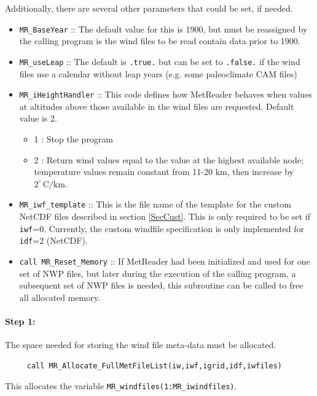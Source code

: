 \documentclass[11pt]{article}   %
\begin{document}
Additionally, there are several other parameters that could be set, if needed.
\begin{itemize}
\item \texttt{MR\_BaseYear} :: The default value for this is 1900, but must be
reassigned by the calling program is the wind files to be read contain data prior to 1900.
\item \texttt{MR\_useLeap} :: The default is \texttt{.true.} but can be set to \texttt{.false.}
if the wind files use a calendar without leap years (e.g. some paleoclimate CAM files)
\item \texttt{MR\_iHeightHandler} :: This code defines how MetReader behaves when values at
altitudes above those available in the wind files are requested.  Default value is 2.
 \begin{itemize}
 \item   1 : Stop the program
 \item   2 : Return wind values equal to the value at the highest available node; temperature
values remain constant from 11-20 km, then increase by $2^{\circ} \, \mathrm{C/km}$.
 \end{itemize}
\item \texttt{MR\_iwf\_template} :: This is the file name of the template for the
custom NetCDF files described in section \ref{SecCust}.  This is only required to be set
if \texttt{iwf}=0.  Currently, the custom windfile specification is only implemented for
\texttt{idf}=2 (NetCDF).
\item \texttt{call MR\_Reset\_Memory} :: If MetReader had been initialized and used for
one set of NWP files, but later during the execution of the calling program, a subsequent
set of NWP files is needed, this subroutine can be called to free all allocated memory.
\end{itemize}

\paragraph{Step 1:} The space needed for storing the wind file meta-data must be allocated.
\begin{verbatim}
     call MR_Allocate_FullMetFileList(iw,iwf,igrid,idf,iwfiles)
\end{verbatim}
This allocates the variable \texttt{MR\_windfiles(1:MR\_iwindfiles)}.
\end{document}
